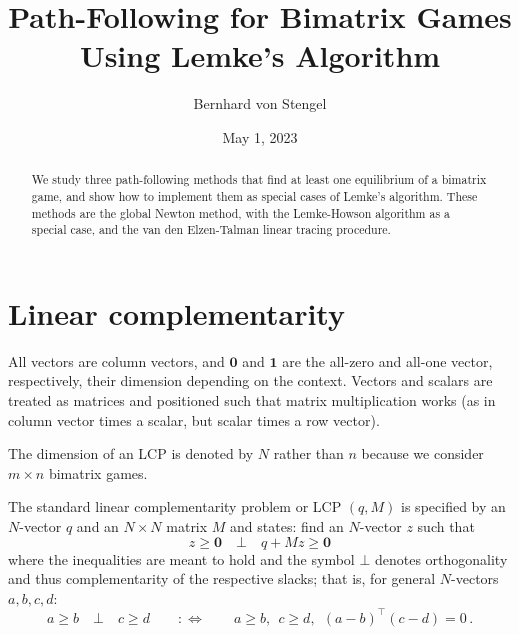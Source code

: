 \documentclass[a4paper,12pt]{article}  %
\title{%
Path-Following for Bimatrix Games Using Lemke's Algorithm
}
\author{Bernhard von Stengel}
\date{May 1, 2023
\\[1ex]
}
\theoremstyle{definition}
\newcommand{\T}{^{\top}}
\newcommand{\0}{{\mathbf0}}
\newcommand{\1}{{\mathbf1}}
\begin{document}
\maketitle

\begin{abstract}
We study three path-following methods that find at least one
equilibrium of a bimatrix game, and show how to implement
them as special cases of Lemke's algorithm.
These methods are the global Newton method, with the
Lemke-Howson algorithm as a special case, and the
van den Elzen-Talman linear tracing procedure.

% 
% 
% 
% 
% 
% 
% 
% 
\end{abstract}

\section{Linear complementarity} 
\label{s-lcp}

All vectors are column vectors, and $\0$ and $\1$ are the
all-zero and all-one vector, respectively, their dimension
depending on the context.
Vectors and scalars are treated as matrices and positioned
such that matrix multiplication works (as in column vector
times a scalar, but scalar times a row vector).

The dimension of an LCP is denoted by $N$ rather than $n$
because we consider $m\times n$ bimatrix games.

The standard linear complementarity problem or LCP $(q,M)$
is specified by an $N$-vector $q$ and an $N\times N$ matrix
$M$ and states: find an $N$-vector $z$ such that
\begin{equation}
\label{lcp}
z\ge\0
\quad\bot\quad
q+Mz\ge\0
\end{equation}
where the inequalities are meant to hold and
the symbol $\bot$ denotes orthogonality and thus
complementarity of the respective slacks; that is, for
general $N$-vectors $a,b,c,d$:
\begin{equation}
\label{bot}
a\ge b
\quad\bot\quad 
c\ge d
\qquad:\Leftrightarrow\qquad
a\ge b,~~
c\ge d,~~
(a-b)\T (c-d)=0\,.
\end{equation}
\end{document}
